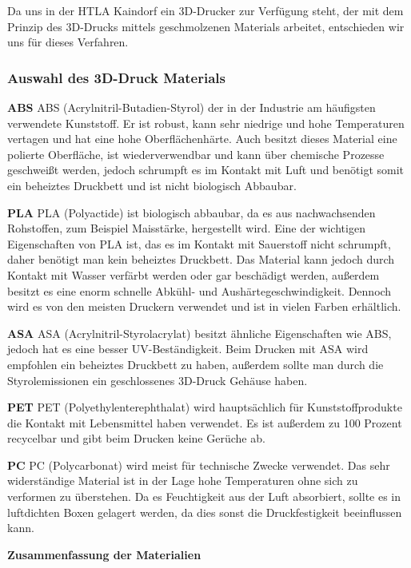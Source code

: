 Da uns in der HTLA Kaindorf ein 3D-Drucker zur Verfügung steht, der mit dem Prinzip des 3D-Drucks mittels geschmolzenen Materials
arbeitet, entschieden wir uns für dieses Verfahren.

\subsubsection{Auswahl des 3D-Druck Materials}

\textbf{ABS}
ABS (Acrylnitril-Butadien-Styrol) der in der Industrie am häufigsten verwendete Kunststoff. Er ist robust, kann sehr
niedrige und hohe Temperaturen vertagen und hat eine hohe Oberflächenhärte. Auch besitzt dieses Material eine polierte Oberfläche,
ist wiederverwendbar und kann über chemische Prozesse geschweißt werden, jedoch schrumpft es im Kontakt mit Luft und benötigt somit ein beheiztes Druckbett und ist
nicht biologisch Abbaubar.

\textbf{PLA}
PLA (Polyactide) ist biologisch abbaubar, da es aus nachwachsenden Rohstoffen, zum Beispiel Maisstärke, hergestellt wird.
Eine der wichtigen Eigenschaften von PLA ist, das es im Kontakt mit Sauerstoff nicht schrumpft, daher benötigt man kein beheiztes
Druckbett. Das Material kann jedoch durch Kontakt mit Wasser verfärbt werden oder gar beschädigt werden, außerdem besitzt
es eine enorm schnelle Abkühl- und Aushärtegeschwindigkeit. Dennoch wird es von den meisten Druckern verwendet und ist
in vielen Farben erhältlich.

\textbf{ASA}
ASA (Acrylnitril-Styrolacrylat) besitzt ähnliche Eigenschaften wie ABS, jedoch hat es eine besser UV-Beständigkeit.
Beim Drucken mit ASA wird empfohlen ein beheiztes Druckbett zu haben, außerdem sollte man durch die Styrolemissionen
ein geschlossenes 3D-Druck Gehäuse haben.

\textbf{PET}
PET (Polyethylenterephthalat) wird hauptsächlich für Kunststoffprodukte die Kontakt mit Lebensmittel haben verwendet.
Es ist außerdem zu 100 Prozent recycelbar und gibt beim Drucken keine Gerüche ab.

\textbf{PC}
PC (Polycarbonat) wird meist für technische Zwecke verwendet. Das sehr widerständige Material ist in der Lage hohe
Temperaturen ohne sich zu verformen zu überstehen. Da es Feuchtigkeit aus der Luft absorbiert, sollte es in luftdichten
Boxen gelagert werden, da dies sonst die Druckfestigkeit beeinflussen kann.

\textbf{Zusammenfassung der Materialien}

